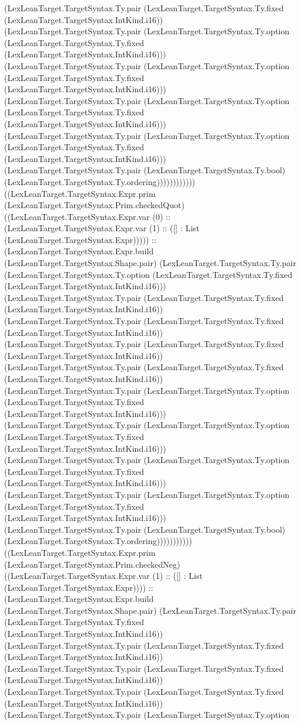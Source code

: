 \documentclass[11pt]{article}
\begin{document}
(LexLeanTarget.TargetSyntax.Ty.pair (LexLeanTarget.TargetSyntax.Ty.fixed (LexLeanTarget.TargetSyntax.IntKind.i16)) (LexLeanTarget.TargetSyntax.Ty.pair (LexLeanTarget.TargetSyntax.Ty.option (LexLeanTarget.TargetSyntax.Ty.fixed (LexLeanTarget.TargetSyntax.IntKind.i16))) (LexLeanTarget.TargetSyntax.Ty.pair (LexLeanTarget.TargetSyntax.Ty.option (LexLeanTarget.TargetSyntax.Ty.fixed (LexLeanTarget.TargetSyntax.IntKind.i16))) (LexLeanTarget.TargetSyntax.Ty.pair (LexLeanTarget.TargetSyntax.Ty.option (LexLeanTarget.TargetSyntax.Ty.fixed (LexLeanTarget.TargetSyntax.IntKind.i16))) (LexLeanTarget.TargetSyntax.Ty.pair (LexLeanTarget.TargetSyntax.Ty.option (LexLeanTarget.TargetSyntax.Ty.fixed (LexLeanTarget.TargetSyntax.IntKind.i16))) (LexLeanTarget.TargetSyntax.Ty.pair (LexLeanTarget.TargetSyntax.Ty.bool) (LexLeanTarget.TargetSyntax.Ty.ordering)))))))))))) ((LexLeanTarget.TargetSyntax.Expr.prim (LexLeanTarget.TargetSyntax.Prim.checkedQuot) ((LexLeanTarget.TargetSyntax.Expr.var (0) :: (LexLeanTarget.TargetSyntax.Expr.var (1) :: ([] : List (LexLeanTarget.TargetSyntax.Expr))))) :: (LexLeanTarget.TargetSyntax.Expr.build (LexLeanTarget.TargetSyntax.Shape.pair) (LexLeanTarget.TargetSyntax.Ty.pair (LexLeanTarget.TargetSyntax.Ty.option (LexLeanTarget.TargetSyntax.Ty.fixed (LexLeanTarget.TargetSyntax.IntKind.i16))) (LexLeanTarget.TargetSyntax.Ty.pair (LexLeanTarget.TargetSyntax.Ty.fixed (LexLeanTarget.TargetSyntax.IntKind.i16)) (LexLeanTarget.TargetSyntax.Ty.pair (LexLeanTarget.TargetSyntax.Ty.fixed (LexLeanTarget.TargetSyntax.IntKind.i16)) (LexLeanTarget.TargetSyntax.Ty.pair (LexLeanTarget.TargetSyntax.Ty.fixed (LexLeanTarget.TargetSyntax.IntKind.i16)) (LexLeanTarget.TargetSyntax.Ty.pair (LexLeanTarget.TargetSyntax.Ty.fixed (LexLeanTarget.TargetSyntax.IntKind.i16)) (LexLeanTarget.TargetSyntax.Ty.pair (LexLeanTarget.TargetSyntax.Ty.option (LexLeanTarget.TargetSyntax.Ty.fixed (LexLeanTarget.TargetSyntax.IntKind.i16))) (LexLeanTarget.TargetSyntax.Ty.pair (LexLeanTarget.TargetSyntax.Ty.option (LexLeanTarget.TargetSyntax.Ty.fixed (LexLeanTarget.TargetSyntax.IntKind.i16))) (LexLeanTarget.TargetSyntax.Ty.pair (LexLeanTarget.TargetSyntax.Ty.option (LexLeanTarget.TargetSyntax.Ty.fixed (LexLeanTarget.TargetSyntax.IntKind.i16))) (LexLeanTarget.TargetSyntax.Ty.pair (LexLeanTarget.TargetSyntax.Ty.option (LexLeanTarget.TargetSyntax.Ty.fixed (LexLeanTarget.TargetSyntax.IntKind.i16))) (LexLeanTarget.TargetSyntax.Ty.pair (LexLeanTarget.TargetSyntax.Ty.bool) (LexLeanTarget.TargetSyntax.Ty.ordering))))))))))) ((LexLeanTarget.TargetSyntax.Expr.prim (LexLeanTarget.TargetSyntax.Prim.checkedNeg) ((LexLeanTarget.TargetSyntax.Expr.var (1) :: ([] : List (LexLeanTarget.TargetSyntax.Expr)))) :: (LexLeanTarget.TargetSyntax.Expr.build (LexLeanTarget.TargetSyntax.Shape.pair) (LexLeanTarget.TargetSyntax.Ty.pair (LexLeanTarget.TargetSyntax.Ty.fixed (LexLeanTarget.TargetSyntax.IntKind.i16)) (LexLeanTarget.TargetSyntax.Ty.pair (LexLeanTarget.TargetSyntax.Ty.fixed (LexLeanTarget.TargetSyntax.IntKind.i16)) (LexLeanTarget.TargetSyntax.Ty.pair (LexLeanTarget.TargetSyntax.Ty.fixed (LexLeanTarget.TargetSyntax.IntKind.i16)) (LexLeanTarget.TargetSyntax.Ty.pair (LexLeanTarget.TargetSyntax.Ty.fixed (LexLeanTarget.TargetSyntax.IntKind.i16)) (LexLeanTarget.TargetSyntax.Ty.pair (LexLeanTarget.TargetSyntax.Ty.option 
\end{document}

